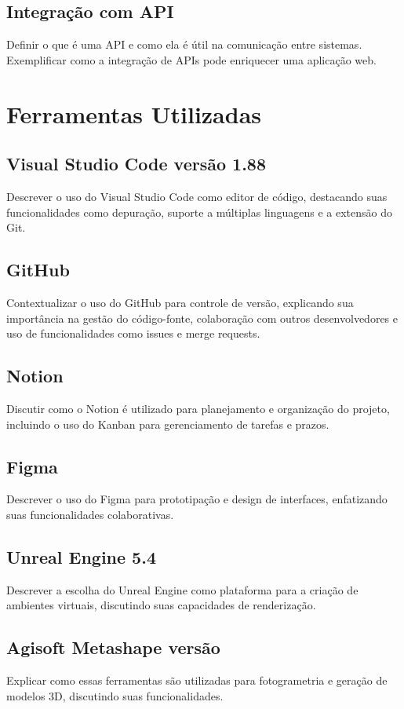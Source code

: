 \subsection{Integração com API}
Definir o que é uma API e como ela é útil na comunicação entre sistemas. Exemplificar como a integração de APIs pode enriquecer uma aplicação web.

\section{Ferramentas Utilizadas}
\subsection{Visual Studio Code versão 1.88}
Descrever o uso do Visual Studio Code como editor de código, destacando suas funcionalidades como depuração, suporte a múltiplas linguagens e a extensão do Git.

\subsection{GitHub}
Contextualizar o uso do GitHub para controle de versão, explicando sua importância na gestão do código-fonte, colaboração com outros desenvolvedores e uso de funcionalidades como issues e merge requests.

\subsection{Notion}
Discutir como o Notion é utilizado para planejamento e organização do projeto, incluindo o uso do Kanban para gerenciamento de tarefas e prazos.

\subsection{Figma}
Descrever o uso do Figma para prototipação e design de interfaces, enfatizando suas funcionalidades colaborativas.


\subsection{Unreal Engine 5.4}
Descrever a escolha do Unreal Engine como plataforma para a criação de ambientes virtuais, discutindo suas capacidades de renderização.

\subsection{Agisoft Metashape versão}
Explicar como essas ferramentas são utilizadas para fotogrametria e geração de modelos 3D, discutindo suas funcionalidades.


